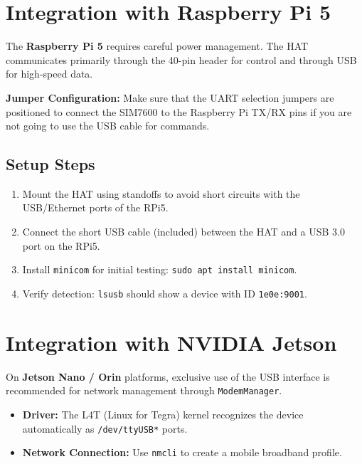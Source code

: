 \documentclass[11pt]{article}
\begin{document}
\section{Integration with Raspberry Pi 5}

The \textbf{Raspberry Pi 5} requires careful power management. The HAT communicates primarily through the 40-pin header for control and through USB for high-speed data.

\begin{notebox}
\textbf{Jumper Configuration:} Make sure that the UART selection jumpers are positioned to connect the SIM7600 to the Raspberry Pi TX/RX pins if you are not going to use the USB cable for commands.
\end{notebox}

\subsection{Setup Steps}
\begin{enumerate}
    \item Mount the HAT using standoffs to avoid short circuits with the USB/Ethernet ports of the RPi5.
    \item Connect the short USB cable (included) between the HAT and a USB 3.0 port on the RPi5.
    \item Install \texttt{minicom} for initial testing: \texttt{sudo apt install minicom}.
    \item Verify detection: \texttt{lsusb} should show a device with ID \texttt{1e0e:9001}.
\end{enumerate}

\section{Integration with NVIDIA Jetson}

On \textbf{Jetson Nano / Orin} platforms, exclusive use of the USB interface is recommended for network management through \texttt{ModemManager}.

\begin{itemize}
    \item \textbf{Driver:} The L4T (Linux for Tegra) kernel recognizes the device automatically as \texttt{/dev/ttyUSB*} ports.
    \item \textbf{Network Connection:} Use \texttt{nmcli} to create a mobile broadband profile.
\end{itemize}
\end{document}
